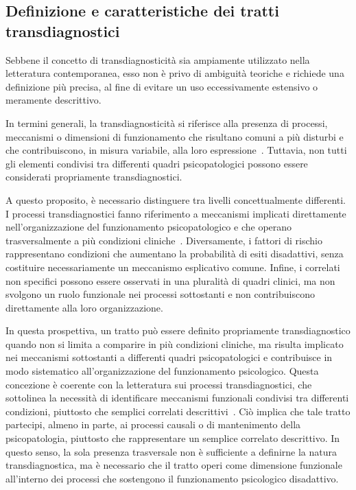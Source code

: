        \subsection{Definizione e caratteristiche dei tratti transdiagnostici}
        \label{sec:2_2_1}

            Sebbene il concetto di transdiagnosticità sia ampiamente utilizzato nella letteratura contemporanea, esso non è privo di ambiguità teoriche e richiede una definizione più precisa, al fine di evitare un uso eccessivamente estensivo o meramente descrittivo.

            In termini generali, la transdiagnosticità si riferisce alla presenza di processi, meccanismi o dimensioni di funzionamento che risultano comuni a più disturbi e che contribuiscono, in misura variabile, alla loro espressione~\cite{astle2022}. Tuttavia, non tutti gli elementi condivisi tra differenti quadri psicopatologici possono essere considerati propriamente transdiagnostici.

            A questo proposito, è necessario distinguere tra livelli concettualmente differenti. I processi transdiagnostici fanno riferimento a meccanismi implicati direttamente nell'organizzazione del funzionamento psicopatologico e che operano trasversalmente a più condizioni cliniche~\cite{nolenhoeksema2011}. Diversamente, i fattori di rischio rappresentano condizioni che aumentano la probabilità di esiti disadattivi, senza costituire necessariamente un meccanismo esplicativo comune. Infine, i correlati non specifici possono essere osservati in una pluralità di quadri clinici, ma non svolgono un ruolo funzionale nei processi sottostanti e non contribuiscono direttamente alla loro organizzazione.

            In questa prospettiva, un tratto può essere definito propriamente transdiagnostico quando non si limita a comparire in più condizioni cliniche, ma risulta implicato nei meccanismi sottostanti a differenti quadri psicopatologici e contribuisce in modo sistematico all'organizzazione del funzionamento psicologico. Questa concezione è coerente con la letteratura sui processi transdiagnostici, che sottolinea la necessità di identificare meccanismi funzionali condivisi tra differenti condizioni, piuttosto che semplici correlati descrittivi~\cite{nolenhoeksema2011}. Ciò implica che tale tratto partecipi, almeno in parte, ai processi causali o di mantenimento della psicopatologia, piuttosto che rappresentare un semplice correlato descrittivo. In questo senso, la sola presenza trasversale non è sufficiente a definirne la natura transdiagnostica, ma è necessario che il tratto operi come dimensione funzionale all'interno dei processi che sostengono il funzionamento psicologico disadattivo.

